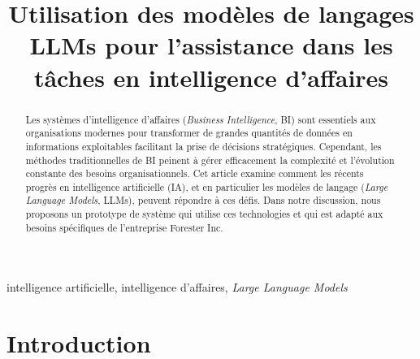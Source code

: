 \documentclass[conference]{IEEEtran}
\begin{document}
\title{Utilisation des modèles de langages LLMs pour l’assistance dans les tâches en intelligence d’affaires}

\author{
\and
{}
\and
{}
}

\maketitle

\begin{abstract}
Les systèmes d’intelligence d’affaires (\textit{Business Intelligence}, BI) sont essentiels aux organisations modernes pour transformer de grandes quantités de données en informations exploitables facilitant la prise de décisions stratégiques. Cependant, les méthodes traditionnelles de BI peinent à gérer efficacement la complexité et l’évolution constante des besoins organisationnels. Cet article examine comment les récents progrès en intelligence artificielle (IA), et en particulier les modèles de langage (\textit{Large Language Models}, LLMs), peuvent répondre à ces défis. Dans notre discussion, nous proposons un prototype de système qui utilise ces technologies et qui est adapté aux besoins spécifiques de l’entreprise Forester Inc.
\end{abstract}

\begin{IEEEkeywords}
intelligence artificielle, intelligence d’affaires, \textit{Large Language Models}
\end{IEEEkeywords}

\section{Introduction}
\label{sec:introduction}
\end{document}
